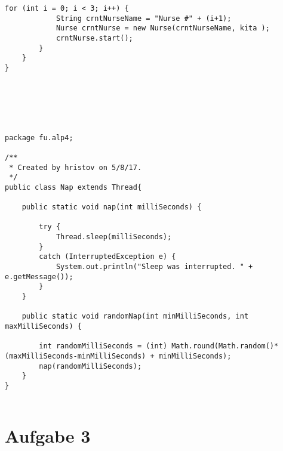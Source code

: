 \begin{lstlisting}[style=java]
        for (int i = 0; i < 3; i++) {
            String crntNurseName = "Nurse #" + (i+1);
            Nurse crntNurse = new Nurse(crntNurseName, kita );
            crntNurse.start();
        }
    }
}






package fu.alp4;

/**
 * Created by hristov on 5/8/17.
 */
public class Nap extends Thread{

    public static void nap(int milliSeconds) {

        try {
            Thread.sleep(milliSeconds);
        }
        catch (InterruptedException e) {
            System.out.println("Sleep was interrupted. " + e.getMessage());
        }
    }

    public static void randomNap(int minMilliSeconds, int maxMilliSeconds) {

        int randomMilliSeconds = (int) Math.round(Math.random()*(maxMilliSeconds-minMilliSeconds) + minMilliSeconds);
        nap(randomMilliSeconds);
    }
}


\end{lstlisting}

\section*{Aufgabe 3}

